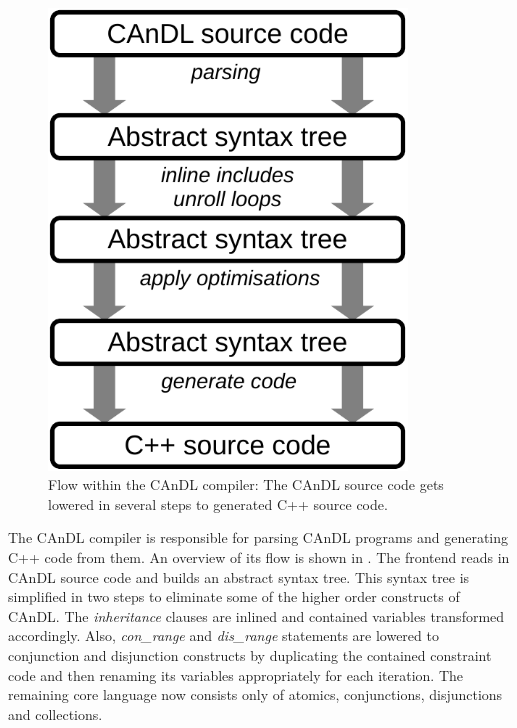 \begin{figure}[t]
\centering
\begin{minipage}{0.7\textwidth}
\centering
\includegraphics[width=0.85\textwidth]{figures/candlstages.pdf}
\caption{Flow within the CAnDL compiler:
         The CAnDL source code gets lowered in several steps to generated C++
         source code.\parfillskip=0pt}
\label{fig:compilerflow}
\end{minipage}
\end{figure}

    The CAnDL compiler is responsible for parsing CAnDL programs and
    generating C++ code from them.
    An overview of its  flow is shown in .
    The frontend reads in  CAnDL source code and builds an abstract syntax tree.
    This syntax tree is simplified in two steps to eliminate some of the higher
    order constructs of CAnDL.
    The {\it inheritance} clauses are inlined and contained variables
    transformed accordingly.
    Also, {\it con\_range} and {\it dis\_range} statements are lowered to
    conjunction and disjunction constructs by duplicating the contained
    constraint code and then renaming its variables appropriately
    for each iteration.
    The remaining core language now consists only of atomics, conjunctions,
    disjunctions and collections.

